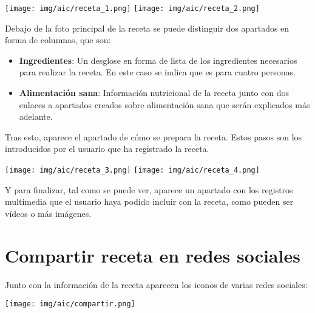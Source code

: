 \documentclass{\ClassPath/viu-tfm-template}
\begin{document}
\begin{center}
    \vspace{-10pt}
    \texttt{[image: img/aic/receta\_1.png]}
    \texttt{[image: img/aic/receta\_2.png]}
    \vspace{-20pt}
\end{center}

Debajo de la foto principal de la receta se puede distinguir dos apartados en forma de columnas, que son:

\begin{itemize}
    \item \textbf{Ingredientes}: Un desglose en forma de lista de los ingredientes necesarios para realizar la receta. En este caso se indica que es para cuatro personas.
    \item \textbf{Alimentación sana}: Información nutricional de la receta junto con dos enlaces a apartados creados sobre alimentación sana que serán explicados más adelante.
\end{itemize}

Tras esto, aparece el apartado de cómo se prepara la receta. Estos pasos son los introducidos por el usuario que ha registrado la receta.


\begin{center}
    \vspace{-10pt}
    \texttt{[image: img/aic/receta\_3.png]}
    \texttt{[image: img/aic/receta\_4.png]}
    \vspace{-20pt}
\end{center}

Y para finalizar, tal como se puede ver, aparece un apartado con los registros multimedia que el usuario haya podido incluir con la receta, como pueden ser vídeos o más imágenes.


\section{Compartir receta en redes sociales}

Junto con la información de la receta aparecen los iconos de varias redes sociales:

\begin{center}
    \vspace{-10pt}
    \texttt{[image: img/aic/compartir.png]}
    \vspace{-20pt}
\end{center}
\end{document}
